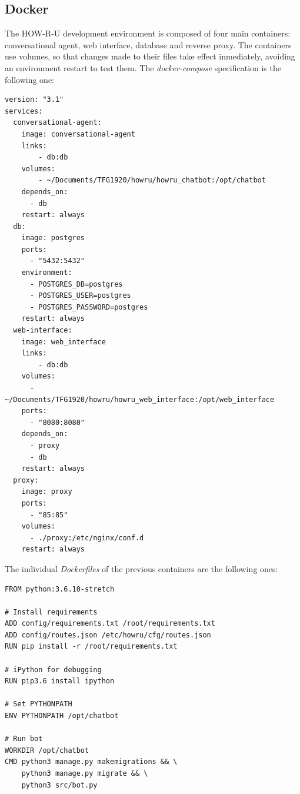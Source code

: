 \documentclass[12pt,english]{article}
\begin{document}
\subsection{Docker}
\label{sec:docker}

The HOW-R-U development environment is composed of four main containers: conversational agent, web interface, database and reverse proxy. The containers use volumes, so that changes made to their files take effect inmediately, avoiding an environment restart to test them. The \emph{docker-compose} specification is the following one:

\begin{lstlisting}[language=docker-compose-2, caption={HOW-R-U docker-compose file}, captionpos=b]
version: "3.1"
services:
  conversational-agent:
    image: conversational-agent
    links:
        - db:db
    volumes:
        - ~/Documents/TFG1920/howru/howru_chatbot:/opt/chatbot
    depends_on:
      - db
    restart: always
  db:
    image: postgres
    ports:
      - "5432:5432"
    environment:
      - POSTGRES_DB=postgres
      - POSTGRES_USER=postgres
      - POSTGRES_PASSWORD=postgres
    restart: always
  web-interface:
    image: web_interface
    links:
        - db:db
    volumes:
      - ~/Documents/TFG1920/howru/howru_web_interface:/opt/web_interface
    ports:
      - "8080:8080"
    depends_on:
      - proxy
      - db
    restart: always
  proxy:
    image: proxy
    ports:
      - "85:85"
    volumes:
      - ./proxy:/etc/nginx/conf.d
    restart: always
\end{lstlisting}

The individual \emph{Dockerfiles} of the previous containers are the following ones:

\begin{lstlisting}[language=docker, caption={HOW-R-U conversational agent Dockerfile}, captionpos=b]
FROM python:3.6.10-stretch

# Install requirements
ADD config/requirements.txt /root/requirements.txt
ADD config/routes.json /etc/howru/cfg/routes.json
RUN pip install -r /root/requirements.txt

# iPython for debugging
RUN pip3.6 install ipython

# Set PYTHONPATH
ENV PYTHONPATH /opt/chatbot

# Run bot
WORKDIR /opt/chatbot
CMD python3 manage.py makemigrations && \
    python3 manage.py migrate && \
    python3 src/bot.py
\end{lstlisting}
\end{document}
